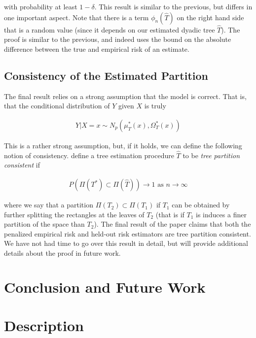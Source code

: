 \documentclass[12pt]{article}
\begin{document}
with probability at least $1 - \delta$. This result is similar to the previous, but differs in one important aspect. Note that there is a term $\phi_n(\hat{T})$ on the right hand side that is a random value (since it depends on our estimated dyadic tree $\hat{T}$). The proof is similar to the previous, and indeed uses the bound on the absolute difference between the true and empirical risk of an estimate.

\subsection{Consistency of the Estimated Partition}

The final result relies on a strong assumption that the model is correct. That is, that the conditional distribution of $Y$ given $X$ is truly

\begin{align}
    Y | X = x \sim N_p(\mu^*_T(x), \Omega_T^*(x))
\end{align}

This is a rather strong assumption, but, if it holds, we can define the following notion of consistency. \cite{liu2009} define a tree estimation procedure $\hat{T}$ to be \textit{tree partition consistent} if

\begin{align}
    P \left(
        \Pi(T^*) \subset \Pi(\hat{T})
    \right) \to 1
    \text{ as } n \to \infty
\end{align}

where we say that a partition $\Pi(T_2) \subset \Pi(T_1)$ if $T_1$ can be obtained by further splitting the rectangles at the leaves of $T_2$ (that is if $T_1$ is induces a finer partition of the space than $T_2$). The final result of the paper claims that both the penalized empirical risk and held-out risk estimators are tree partition consistent. We have not had time to go over this result in detail, but will provide additional details about the proof in future work. 

\section{Conclusion and Future Work}





\section{Description}
\label{sec:description}
\end{document}

